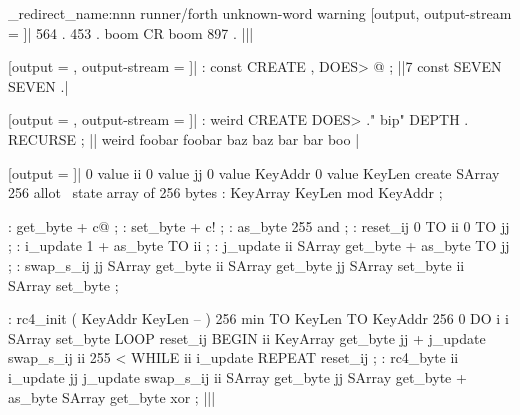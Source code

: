 {
  \ExplSyntaxOn
  \msg_redirect_name:nnn { runner/forth } { unknown-word } { warning }
  [output, output-stream = \z@]|
    564 . 453 . boom CR boom 897 .
  |||
}

[output = \result, output-stream = \z@]|
  : const CREATE , DOES> @ ;
||7 const SEVEN SEVEN .|
\typeout{\result}

[output = \result, output-stream = \z@]|
  : weird CREATE DOES> ." bip" DEPTH . RECURSE ;
||
  weird foobar foobar baz baz bar bar boo
|
\typeout{\result}

\stop

[output = \result]|
  0 value ii        0 value jj
  0 value KeyAddr   0 value KeyLen
  create SArray   256 allot   \ state array of 256 bytes
  : KeyArray      KeyLen mod   KeyAddr ;

  : get_byte      + c@ ;
  : set_byte      + c! ;
  : as_byte       255 and ;
  : reset_ij      0 TO ii   0 TO jj ;
  : i_update      1 +   as_byte TO ii ;
  : j_update      ii SArray get_byte +   as_byte TO jj ;
  : swap_s_ij
      jj SArray get_byte
         ii SArray get_byte  jj SArray set_byte
      ii SArray set_byte
  ;

  : rc4_init ( KeyAddr KeyLen -- )
      256 min TO KeyLen   TO KeyAddr
      256 0 DO   i i SArray set_byte   LOOP
      reset_ij
      BEGIN
          ii KeyArray get_byte   jj +  j_update
          swap_s_ij
          ii 255 < WHILE
          ii i_update
      REPEAT
      reset_ij
  ;
  : rc4_byte
      ii i_update   jj j_update
      swap_s_ij
      ii SArray get_byte   jj SArray get_byte +   as_byte SArray get_byte  xor
  ;
|||
\typeout{\result}

\stop